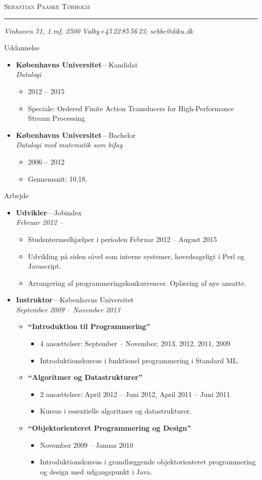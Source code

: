 \documentclass[11pt,oneside,a4paper]{article}
\makeatletter
\newcommand{\name}{Sebastian Paaske Tørholm}
\newcommand{\addr}{Vinhaven 51, 1.mf, 2500 Valby}
\newcommand{\phone}{+45\,22\,85\,56\,23}
\newcommand{\email}{sebbe@diku.dk}
\newcommand{\bigname}[1]{
    \begin{center}\fontfamily{phv}\selectfont\Huge\scshape#1\end{center}
}
\newenvironment{ressection}[1]{
    \vspace{4pt}
    {\fontfamily{phv}\selectfont\Large#1}
    \begin{itemize}
    \vspace{3pt}
}{
    \end{itemize}
}
\newcommand{\resitem}[1]{
    \vspace{-4pt}
    \item \begin{flushleft} #1 \end{flushleft}
}
\newcommand{\ressubitem}[1]{
    \vspace{-1pt}
    \item \begin{flushleft} #1 \end{flushleft}
}
\newcommand{\resbigitem}[3]{
    \vspace{-5pt}
    \item
    \textbf{#1}---#2 \\
    \textit{#3}
}
\newenvironment{ressubsec}[3]{
    \resbigitem{#1}{#2}{#3}
    \vspace{-2pt}
    \begin{itemize}
}{
    \end{itemize}
}
\newenvironment{reslist}[1]{
    \resitem{\textbf{#1}}
    \vspace{-2pt}
    \begin{itemize}
}{
    \end{itemize}
}
\makeatother
\begin{document}
 \selectfont

\bigname{\name}

\vspace{-8pt} \rule{\textwidth}{1pt}

\vspace{-1pt} {\small\itshape \addr \hfill \phone; \email}

\vspace{8 pt}




\begin{ressection}{Uddannelse}
    \begin{ressubsec}{Københavns Universitet}{Kandidat}{Datalogi}
        \ressubitem{2012 -- 2015}
        \ressubitem{Speciale: Ordered Finite Action Transducers for High-Performance Stream Processing}
    \end{ressubsec}

    \begin{ressubsec}{Københavns Universitet}{Bachelor}{Datalogi med matematik som bifag}
        \ressubitem{2006 -- 2012}
        \ressubitem{Gennemsnit: 10,18.}
    \end{ressubsec}

\end{ressection}


\begin{ressection}{Arbejde}
    \begin{ressubsec}{Udvikler}{Jobindex}{Februar 2012 -- }
        \ressubitem{Studentermedhjælper i perioden Februar 2012 -- August 2015}
        \ressubitem{Udvikling på siden såvel som interne systemer, hovedsageligt i Perl og Javascript.}
        \ressubitem{Arrangering af programmeringskonkurrencer. Oplæring af nye ansatte.}
    \end{ressubsec}

    \begin{ressubsec}{Instruktor}{Københavns Universitet}{September 2009 -- November 2013}
        \begin{reslist}{``Introduktion til Programmering''}
            \ressubitem{4 ansættelser: September -- November; 2013, 2012, 2011, 2009}
            \ressubitem{Introduktionskursus i funktionel programmering i Standard ML.}
        \end{reslist}
        \begin{reslist}{``Algoritmer og Datastrukturer''}
            \ressubitem{2 ansættelser: April 2012 -- Juni 2012, April 2011 -- Juni 2011}
            \ressubitem{Kursus i essentielle algoritmer og datastrukturer.}
        \end{reslist}
        \begin{reslist}{``Objektorienteret Programmering og Design''}
            \ressubitem{November 2009 -- Januar 2010}
            \ressubitem{Introduktionskursus i grundlæggende objektorienteret programmering og design med udgangspunkt i Java.}
        \end{reslist}
    \end{ressubsec}

\end{ressection}
\end{document}
